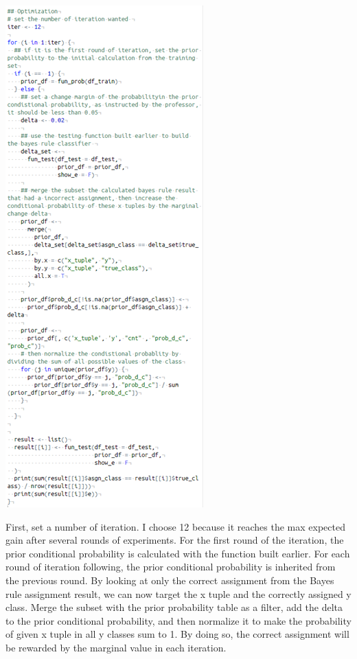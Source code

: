 \documentclass{article}
\begin{document}
\begin{multicols}{2}
\includegraphics{fig11.png}

First, set a number of iteration. I choose 12 because it reaches the max expected gain after several rounds of experiments. 
For the first round of the iteration, the prior conditional probability is calculated with the function built earlier.
For each round of iteration following, the prior conditional probability is inherited from the previous round. 
By looking at only the correct assignment from the Bayes rule assignment result, we can now target the x tuple and the correctly assigned y class. Merge the subset with the prior probability table as a filter, add the delta to the prior conditional probability, and then normalize it to make the probability of given x tuple in all y classes sum to 1. 
By doing so, the correct assignment will be rewarded by the marginal value in each iteration. 


\end{multicols}
\end{document}
